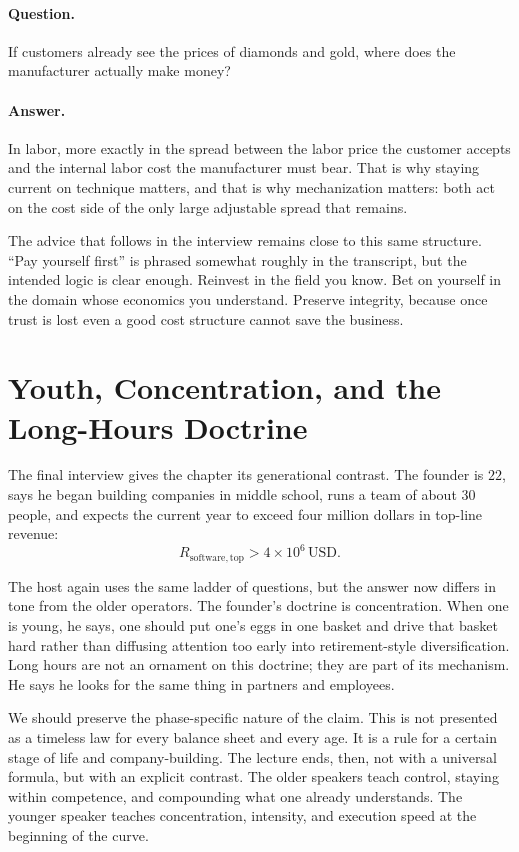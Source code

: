 \paragraph{Question.} If customers already see the prices of diamonds and gold, where does the manufacturer actually make money?

\paragraph{Answer.} In labor, more exactly in the spread between the labor price the customer accepts and the internal labor cost the manufacturer must bear. That is why staying current on technique matters, and that is why mechanization matters: both act on the cost side of the only large adjustable spread that remains.

The advice that follows in the interview remains close to this same structure. ``Pay yourself first'' is phrased somewhat roughly in the transcript, but the intended logic is clear enough. Reinvest in the field you know. Bet on yourself in the domain whose economics you understand. Preserve integrity, because once trust is lost even a good cost structure cannot save the business.

\section{Youth, Concentration, and the Long-Hours Doctrine}

The final interview gives the chapter its generational contrast. The founder is \(22\), says he began building companies in middle school, runs a team of about \(30\) people, and expects the current year to exceed four million dollars in top-line revenue:
\begin{equation}
R_{\mathrm{software},\mathrm{top}} > 4\times 10^6 \,\mathrm{USD}.
\end{equation}

The host again uses the same ladder of questions, but the answer now differs in tone from the older operators. The founder's doctrine is concentration. When one is young, he says, one should put one's eggs in one basket and drive that basket hard rather than diffusing attention too early into retirement-style diversification. Long hours are not an ornament on this doctrine; they are part of its mechanism. He says he looks for the same thing in partners and employees.

We should preserve the phase-specific nature of the claim. This is not presented as a timeless law for every balance sheet and every age. It is a rule for a certain stage of life and company-building. The lecture ends, then, not with a universal formula, but with an explicit contrast. The older speakers teach control, staying within competence, and compounding what one already understands. The younger speaker teaches concentration, intensity, and execution speed at the beginning of the curve.

